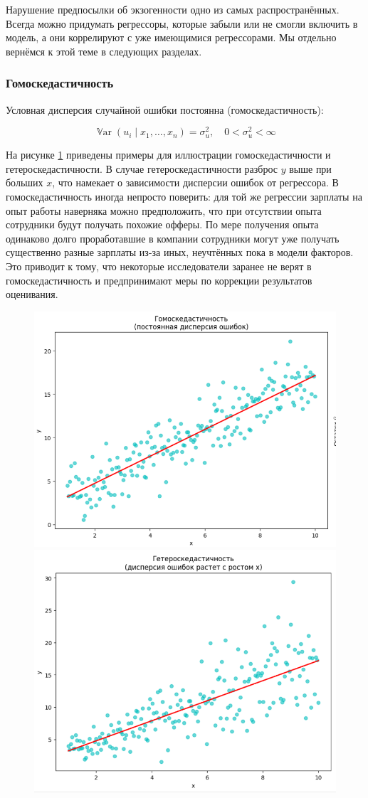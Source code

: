 \documentclass[12pt]{article}
\DeclareMathOperator{\Var}{\mathbb{V}ar}
\begin{document}
Нарушение предпосылки об экзогенности одно из самых распространённых. Всегда можно придумать регрессоры, которые забыли или не смогли включить в модель, а они коррелируют с уже имеющимися регрессорами. Мы отдельно вернёмся к этой теме в следующих разделах.

\subsubsection*{Гомоскедастичность}

Условная дисперсия случайной ошибки постоянна (гомоскедастичность):

\[ \Var(u_i \mid x_1, \dots, x_n) = \sigma_u^2, \quad 0 < \sigma_u^2 < \infty \]

На рисунке \ref{fig:homohet} приведены примеры для иллюстрации гомоскедастичности и гетероскедастичности. В случае гетероскедастичности разброс $y$ выше при больших $x$, что намекает о зависимости дисперсии ошибок от регрессора. В гомоскедастичность иногда непросто поверить: для той же регрессии зарплаты на опыт работы наверняка можно предположить, что при отсутствии опыта сотрудники будут получать похожие офферы. По мере получения опыта одинаково долго проработавшие в компании сотрудники могут уже получать существенно разные зарплаты из-за иных, неучтённых пока в модели факторов. Это приводит к тому, что некоторые исследователи заранее не верят в гомоскедастичность и предпринимают меры по коррекции результатов оценивания.

\begin{figure}[h]
    \centering
    \includegraphics[width=0.4\linewidth]{figures/homosq.png}
    \includegraphics[width=0.4\linewidth]{figures/heterosq.png}
    \label{fig:homohet}
\end{figure}
\end{document}
